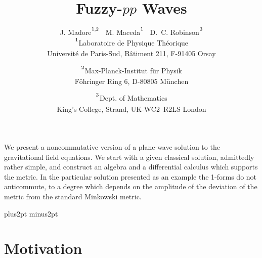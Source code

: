 \documentclass[12pt,a4paper]{article}
\newcounter{eg}
\newcommand{\initiate}{\setcounter{equation}{0}}
\begin{document}
\title{Fuzzy-{$pp$} Waves}

\author{J. Madore$\strut^{1,2}$ \ M. Maceda$\strut^{1}$ \
        D.~C. Robinson$\strut^{3}$\\[10pt]
        $\strut^{1}$Laboratoire de Physique Th\'eorique\\
        Universit\'e de Paris-Sud, B\^atiment 211, F-91405 Orsay%
\and    $\strut^{2}$Max-Planck-Institut f\"ur Physik\\
        F\"ohringer Ring 6, D-80805 M\"unchen\\[5pt]
\and    $\strut^{3}$Dept. of Mathematics\\
        King's College, Strand, UK-WC2~R2LS London}

\date{}

\maketitle

\abstract

We present a noncommutative version of a plane-wave solution to the
gravitational field equations. We start with a given classical
solution, admittedly rather simple, and construct an algebra and a
differential calculus which supports the metric. In the particular
solution presented as an example the 1-forms do not anticommute, to a
degree which depends on the amplitude of the deviation of the metric
from the standard Minkowski metric.


\vfill

\medskip
\eject

\parskip 4pt plus2pt minus2pt

\initiate
\section{Motivation}
\end{document}
